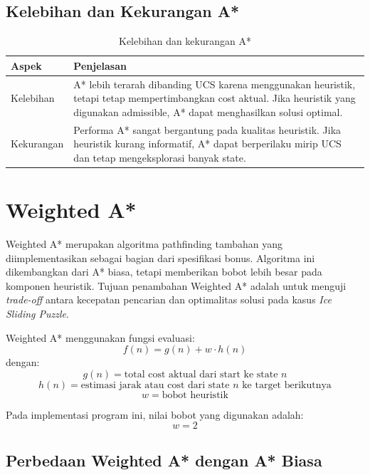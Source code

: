 \subsection{Kelebihan dan Kekurangan A*}

\begin{table}[H]
	\centering
	\caption{Kelebihan dan kekurangan A*}
	\begin{tabular}{|p{3cm}|p{11cm}|}
		\hline
		\rowcolor{red!15}
		\textbf{Aspek} & \textbf{Penjelasan} \\
		\hline
		Kelebihan & A* lebih terarah dibanding UCS karena menggunakan heuristik, tetapi tetap mempertimbangkan cost aktual. Jika heuristik yang digunakan admissible, A* dapat menghasilkan solusi optimal. \\
		\hline
		Kekurangan & Performa A* sangat bergantung pada kualitas heuristik. Jika heuristik kurang informatif, A* dapat berperilaku mirip UCS dan tetap mengeksplorasi banyak state. \\
		\hline
	\end{tabular}
\end{table}

\section{Weighted A*}

Weighted A* merupakan algoritma pathfinding tambahan yang diimplementasikan sebagai bagian dari spesifikasi bonus. 
Algoritma ini dikembangkan dari A* biasa, tetapi memberikan bobot lebih besar pada komponen heuristik. 
Tujuan penambahan Weighted A* adalah untuk menguji \textit{trade-off} antara kecepatan pencarian dan optimalitas solusi pada kasus \textit{Ice Sliding Puzzle}.

\begin{tcolorbox}[
	colback=purple!5,
	colframe=purple!60!black,
	title=\textbf{Prinsip Weighted A*},
	arc=2mm,
	boxrule=0.8pt
]
Weighted A* menggunakan fungsi evaluasi:
\[
	f(n) = g(n) + w \cdot h(n)
\]
dengan:
\[
	g(n) = \text{total cost aktual dari start ke state } n
\]
\[
	h(n) = \text{estimasi jarak atau cost dari state } n \text{ ke target berikutnya}
\]
\[
	w = \text{bobot heuristik}
\]

Pada implementasi program ini, nilai bobot yang digunakan adalah:
\[
	w = 2
\]
\end{tcolorbox}

\subsection{Perbedaan Weighted A* dengan A* Biasa}

